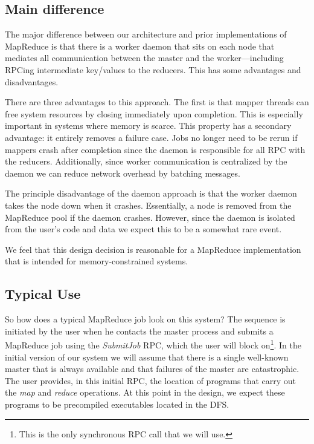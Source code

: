 \documentclass[10pt,letter,final,article,twocolumn]{article} %
\newcommand{\rpc}[1]{\emph{#1}}
\begin{document}
\subsection{Main difference}

The major difference between our architecture and prior implementations of MapReduce is that there is a worker daemon that sits on each node that mediates all communication between the master and the worker---including RPCing intermediate key/values to the reducers. This has some advantages and disadvantages.

There are three advantages to this approach. The first is that mapper threads can free system resources by closing immediately upon completion. This is especially important in systems where memory is scarce. This property has a secondary advantage: it entirely removes a failure case. Jobs no longer need to be rerun if mappers crash after completion since the daemon is responsible for all RPC with the reducers. Additionally, since worker communication is centralized by the daemon we can reduce network overhead by batching messages.

The principle disadvantage of the daemon approach is that the worker daemon takes the node down when it crashes.  Essentially, a node is removed from the MapReduce pool if the daemon crashes. However, since the daemon is isolated from the user's code and data we expect this to be a somewhat rare event.

We feel that this design decision is reasonable for a MapReduce implementation that is intended for memory-constrained systems.

\subsection{Typical Use}

So how does a typical MapReduce job look on this system? The sequence is initiated by the user when he contacts the master process and submits a MapReduce job using the \rpc{SubmitJob} RPC, which the user will block on\footnote{This is the only synchronous RPC call  that we will use.}. In the initial version of our system we will assume that there is a single well-known master that is always available and that failures of the master are catastrophic. The user provides, in this initial RPC, the location of programs that carry out the \emph{map} and \emph{reduce} operations. At this point in the design, we expect these programs to be precompiled executables located in the DFS.
\end{document}
